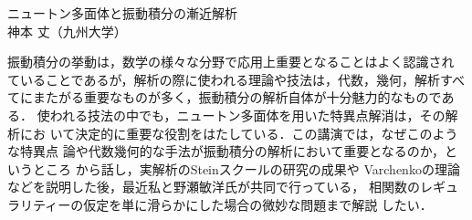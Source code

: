 \documentclass[a4paper,reqno,12pt]{article}
\theoremstyle{plain}
\theoremstyle{definition}
\theoremstyle{remark}
\begin{document}
\begin{center}
\begin{Large}
ニュートン多面体と振動積分の漸近解析
\vspace{12pt}
\\
神本 丈（九州大学）
\end{Large}
\end{center}
%
%
\par
%
%
振動積分の挙動は，数学の様々な分野で応用上重要となることはよく認識され
ていることであるが，解析の際に使われる理論や技法は，代数，幾何，解析すべ
てにまたがる重要なものが多く，振動積分の解析自体が十分魅力的なものである．
使われる技法の中でも，ニュートン多面体を用いた特異点解消は，その解析にお
いて決定的に重要な役割をはたしている．この講演では，なぜこのような特異点
論や代数幾何的な手法が振動積分の解析において重要となるのか，というところ
から話し，実解析のSteinスクールの研究の成果や
Varchenkoの理論などを説明した後，最近私と野瀬敏洋氏が共同で行っている，
相関数のレギュラリティーの仮定を単に滑らかにした場合の微妙な問題まで解説
したい． 
%
%
%
%
\end{document}

